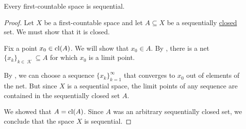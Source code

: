 \begin{proposition}\label{thm:first_countable_spaces_are_sequential}
  Every first-countable space is sequential.
\end{proposition}
\begin{proof}
  Let \( X \) be a first-countable space and let \( A \subseteq X \) be a sequentially \hyperref[def:sequential_closure_operator]{closed} set. We must show that it is closed.

  Fix a point \( x_0 \in \operatorname{cl}(A) \). We will show that \( x_0 \in A \). By , there is a net \( \{ x_k \}_{k \in \mscrK} \subseteq A \) for which \( x_0 \) is a limit point.

  By , we can choose a sequence \( \{ x_k \}_{k=1}^\infty \) that converges to \( x_0 \) out of elements of the net. But since \( X \) is a sequential space, the limit points of any sequence are contained in the sequentially closed set \( A \).

  We showed that \( A = \operatorname{cl}(A) \). Since \( A \) was an arbitrary sequentially closed set, we conclude that the space \( X \) is sequential.
\end{proof}

